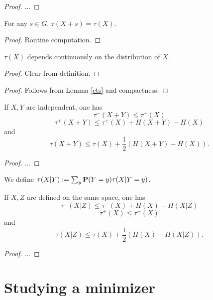 \begin{proof} ...
\end{proof}

\begin{lemma}\label{tau-invariant}  For any $s \in G$, $\tau(X+s) = \tau(X)$.
\end{lemma}

\begin{proof} Routine computation.
\end{proof}

\begin{lemma}\label{tau-cts} $\tau(X)$ depends continuously on the distribution of $X$.
\end{lemma}

\begin{proof}  Clear from definition.
\end{proof}

\begin{proof} Follows from Lemma \ref{cts} and compactness.
\end{proof}

\begin{lemma}\label{tau-sums}  If $X,Y$ are independent, one has
  $$ \tau^-(X+Y) \leq \tau^-(X)$$
  $$ \tau^+(X+Y) \leq \tau^+(X) + H(X+Y) - H(X)$$
and
  $$ \tau(X+Y) \leq \tau(X) + \frac{1}{2}( H(X+Y) - H(X) ).$$
\end{lemma}

\begin{proof}
  ...
\end{proof}


\begin{definition}  We define $\tau(X|Y) := \sum_y {\bf P}(Y=y) \tau(X|Y=y)$.
\end{definition}

\begin{lemma}  If $X,Z$ are defined on the same space, one has
  $$ \tau^-(X|Z) \leq \tau^-(X) + H(X) - H(X|Z)$$
  $$ \tau^+(X) \leq \tau^+(X)$$
and
  $$ \tau(X|Z) \leq \tau(X) + \frac{1}{2}( H(X) - H(X|Z) ).$$
\end{lemma}

\begin{proof}
  ...
\end{proof}


\section{Studying a minimizer}

